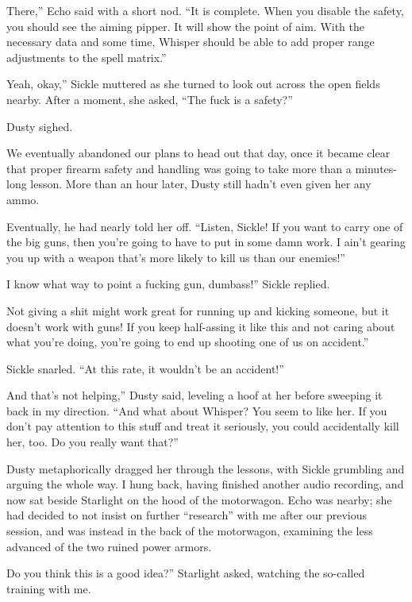 \leavevmode{}There,” Echo said with a short nod. “It is complete. When you disable the safety, you should see the aiming pipper. It will show the point of aim. With the necessary data and some time, Whisper should be able to add proper range adjustments to the spell matrix.”

\leavevmode{}Yeah, okay,” Sickle muttered as she turned to look out across the open fields nearby. After a moment, she asked, “The fuck is a safety?”

Dusty sighed.

{\br}%
We eventually abandoned our plans to head out that day, once it became clear that proper firearm safety and handling was going to take more than a minutes-long lesson. More than an hour later, Dusty still hadn’t even given her any ammo.

Eventually, he had nearly told her off. “Listen, Sickle! If you want to carry one of the big guns, then you’re going to have to put in some damn work. I ain’t gearing you up with a weapon that’s more likely to kill us than our enemies!”

\leavevmode{}I know what way to point a fucking gun, dumbass!” Sickle replied.

\leavevmode{}Not giving a shit might work great for running up and kicking someone, but it doesn’t work with guns! If you keep half-assing it like this and not caring about what you’re doing, you’re going to end up shooting one of us on accident.”

Sickle snarled. “At this rate, it wouldn’t be an accident!”

\leavevmode{}And that’s not helping,” Dusty said, leveling a hoof at her before sweeping it back in my direction. “And what about Whisper? You seem to like her. If you don’t pay attention to this stuff and treat it seriously, you could accidentally kill her, too. Do you really want that?”

Dusty metaphorically dragged her through the lessons, with Sickle grumbling and arguing the whole way. I hung back, having finished another audio recording, and now sat beside Starlight on the hood of the motorwagon. Echo was nearby; she had decided to not insist on further “research” with me after our previous session, and was instead in the back of the motorwagon, examining the less advanced of the two ruined power armors.

\leavevmode{}Do you think this is a good idea?” Starlight asked, watching the so-called training with me.

